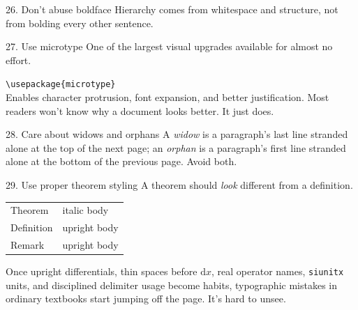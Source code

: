 \documentclass[11pt]{article}
\begin{document}
\begin{tipbox}{26. Don't abuse boldface}
Hierarchy comes from whitespace and structure, not from bolding every
other sentence.
\end{tipbox}

\begin{tipbox}{27. Use microtype}
One of the largest visual upgrades available for almost no effort.
\end{tipbox}
\begin{goodcode}
\verb|\usepackage{microtype}|\\[2pt]
Enables character protrusion, font expansion, and better justification.
Most readers won't know why a document looks better. It just does.
\end{goodcode}

\begin{tipbox}{28. Care about widows and orphans}
A \emph{widow} is a paragraph's last line stranded alone at the top of
the next page; an \emph{orphan} is a paragraph's first line stranded
alone at the bottom of the previous page. Avoid both.
\end{tipbox}

\begin{tipbox}{29. Use proper theorem styling}
A theorem should \emph{look} different from a definition.
\end{tipbox}
\begin{center}
\begin{tabular}{ll}
Theorem & italic body \\
Definition & upright body \\
Remark & upright body
\end{tabular}
\end{center}


\vfill
{\small\color{nord3}\noindent
Once upright differentials, thin spaces before $\mathrm{d}x$, real
operator names, \texttt{siunitx} units, and disciplined delimiter usage
become habits, typographic mistakes in ordinary textbooks start jumping
off the page. It's hard to unsee.}
\end{document}
